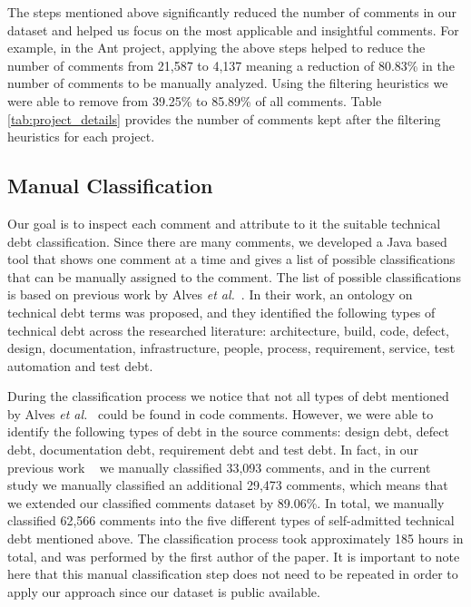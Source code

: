 The steps mentioned above significantly reduced the number of comments in our dataset and helped us focus on the most applicable and insightful comments. For example, in the Ant project, applying the above steps helped to reduce the number of comments from 21,587 to 4,137 meaning a reduction of 80.83\% in the number of comments to be manually analyzed. Using the filtering heuristics we were able to remove from 39.25\% to 85.89\% of all comments. Table \ref{tab:project_details} provides the number of comments kept after the filtering heuristics for each project.


\subsection{Manual Classification} %
\label{sub:manual_classification}

Our goal is to inspect each comment and attribute to it the suitable technical debt classification. Since there are many comments, we developed a Java based tool that shows one comment at a time and gives a list of possible classifications that can be manually assigned to the comment. The list of possible classifications is based on previous work by Alves \textit{et al.}~\cite{Alves2014MTD}. In their work, an ontology on technical debt terms was proposed, and they identified the following types of technical debt across the researched literature: architecture, build, code, defect, design, documentation, infrastructure, people, process, requirement, service, test automation and test debt. 

During the classification process we notice that not all types of debt mentioned by Alves \emph{et al.}~\cite{Alves2014MTD} could be found in code comments. However, we were able to identify the following types of debt in the source comments: design debt, defect debt, documentation debt, requirement debt and test debt. In fact, in our previous work ~\cite{Maldonado2015MTD} we manually classified 33,093 comments, and in the current study we manually classified an additional 29,473 comments, which means that we extended our classified comments dataset by 89.06\%. In total, we manually classified 62,566 comments into the five different types of self-admitted technical debt mentioned above. The classification process took approximately 185 hours in total, and was performed by the first author of the paper. It is important to note here that this manual classification step does not need to be repeated in order to apply our approach since our dataset is public available. 


